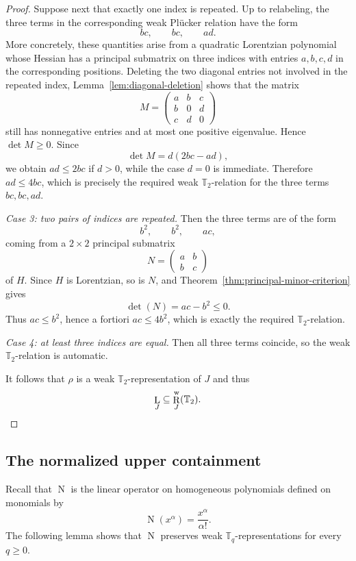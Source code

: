 \documentclass[12pt]{amsart}
\theoremstyle{definition}
\newcommand{\1}{\mathbf{1}}
\DeclareMathOperator{\upN}{N}   %
\DeclareMathOperator{\upL}{L}   %
\DeclareMathOperator{\upR}{R}   %
\newcommand\T{{\mathbb T}}
\begin{document}
\begin{proof}
Suppose next that exactly one index is repeated.  Up to relabeling, the three
terms in the corresponding weak Plücker relation have the form
\[
bc,\qquad bc,\qquad ad .
\]
More concretely, these quantities arise from a quadratic Lorentzian polynomial
whose Hessian has a principal submatrix on three indices with entries $a,b,c,d$
in the corresponding positions.  Deleting the two diagonal entries not involved
in the repeated index, Lemma~\ref{lem:diagonal-deletion} shows that the matrix
\[
M=
\begin{pmatrix}
a & b & c\\
b & 0 & d\\
c & d & 0
\end{pmatrix}
\]
still has nonnegative entries and at most one positive eigenvalue.  Hence
$\det M\ge 0$.  Since
\[
\det M=d(2bc-ad),
\]
we obtain $ad\le 2bc$ if $d>0$, while the case $d=0$ is immediate.
Therefore $ad\le 4bc$, which is precisely the required weak $\T_2$-relation
for the three terms $bc,bc,ad$.

\smallskip

\emph{Case 3: two pairs of indices are repeated.}
Then the three terms are of the form
\[
b^2,\qquad b^2,\qquad ac,
\]
coming from a $2\times 2$ principal submatrix
\[
N=
\begin{pmatrix}
a & b\\
b & c
\end{pmatrix}
\]
of $H$. Since $H$ is Lorentzian, so is $N$, and
Theorem~\ref{thm:principal-minor-criterion} gives
\[
\det(N)=ac-b^2\le 0.
\]
Thus $ac\le b^2$, hence a fortiori $ac\le 4b^2$, which is exactly the required
$\T_2$-relation.

\smallskip

\emph{Case 4: at least three indices are equal.}
Then all three terms coincide, so the
weak $\T_2$-relation is automatic.


\smallskip

It follows that $\rho$ is a weak $\mathbb T_2$-representation of $J$ and thus
\[
\upL_J\subseteq \upR_J^{\rm w}(\mathbb T_2).\qedhere    
\]
\end{proof}

\subsection{The normalized upper containment}\label{sec:defnorm}

Recall that $\upN$ is the linear operator on homogeneous polynomials defined on monomials by
\[
\upN(x^\alpha)=\frac{x^\alpha}{\alpha!}.
\]
The following lemma shows that $\upN$ preserves weak $\T_q$-representations for every
$q\ge 0$.
\end{document}
